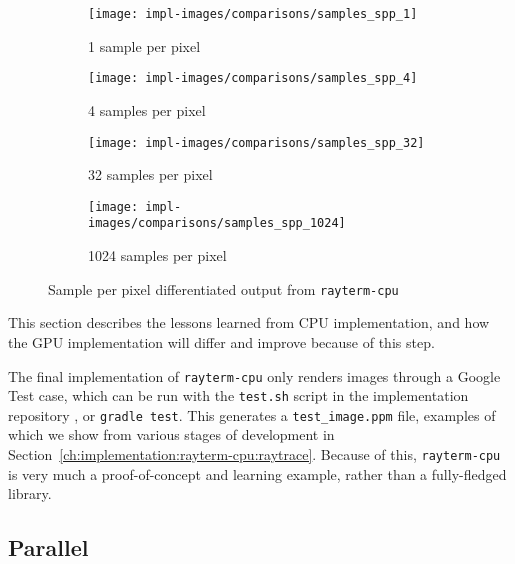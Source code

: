 \begin{figure}[htb]
  \centering
  \begin{subfigure}[htb]{0.45\textwidth}
    \texttt{[image: impl-images/comparisons/samples\_spp\_1]}
    \caption{1 sample per pixel}
    \label{fig:rayterm-cpu-ppm-noisy-1}
  \end{subfigure}
  \hspace{1em}
  \begin{subfigure}[htb]{0.45\textwidth}
    \texttt{[image: impl-images/comparisons/samples\_spp\_4]}
    \caption{4 samples per pixel}
    \label{fig:rayterm-cpu-ppm-noisy-4}
  \end{subfigure}
  \vspace{1em}
  \begin{subfigure}[htb]{0.45\textwidth}
    \texttt{[image: impl-images/comparisons/samples\_spp\_32]}
    \caption{32 samples per pixel}
    \label{fig:rayterm-cpu-ppm-noisy-32}
  \end{subfigure}
  \hspace{1em}
  \begin{subfigure}[htb]{0.45\textwidth}
    \texttt{[image: impl-images/comparisons/samples\_spp\_1024]}
    \caption{1024 samples per pixel}
    \label{fig:rayterm-cpu-ppm-noisy-1024}
  \end{subfigure}
  \caption{Sample per pixel differentiated output from \texttt{rayterm-cpu}}
  \label{fig:rayterm-cpu-ppm-noisy}
\end{figure}

 \label{ch:methods:renderer:sequential:prototype}

This section describes the lessons learned from CPU implementation, and how the GPU implementation will differ and improve because of this step.

The final implementation of \texttt{rayterm-cpu} only renders images through a Google Test \cite{googletest} case, which can be run with the \texttt{test.sh} script in the implementation repository \cite{raytermCpuImpl}, or \texttt{gradle test}.
This generates a \texttt{test\_image.ppm} file, examples of which we show from various stages of development in Section~\ref{ch:implementation:rayterm-cpu:raytrace}.
Because of this, \texttt{rayterm-cpu} is very much a proof-of-concept and learning example, rather than a fully-fledged library.

\subsection{Parallel} \label{ch:methods:renderer:parallel}

